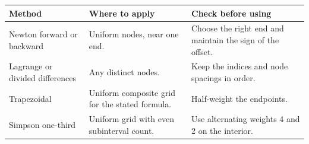 \documentclass[12pt,a4paper]{article}
\begin{document}
\begin{tcolorbox}[tikzbox, title={Summary Comparison}]
\par\vspace{5pt}
\begingroup
\setlength{\extrarowheight}{1pt}
\noindent\begin{tabularx}{\linewidth}{|B{3.45cm}|Y|Y|}
\hline
\textbf{Method} & \textbf{Where to apply} & \textbf{Check before using} \\ \hline
Newton forward or backward & Uniform nodes, near one end. & Choose the right end and maintain the sign of the offset. \\ \hline
Lagrange or divided differences & Any distinct nodes. & Keep the indices and node spacings in order. \\ \hline
Trapezoidal & Uniform composite grid for the stated formula. & Half-weight the endpoints. \\ \hline
Simpson one-third & Uniform grid with even subinterval count. & Use alternating weights 4 and 2 on the interior. \\ \hline
\end{tabularx}\par
\endgroup
\end{tcolorbox}
\end{document}
